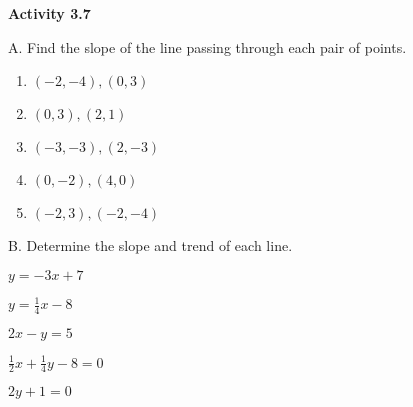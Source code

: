   \vspace*{-0.3ex}
\noindent\textbf{Activity 3.7}

\vspace{0.2ex}

\noindent A. Find the slope of the line passing through each pair of points.
\vspace{-1ex}
\begin{multicols}{3}
\begin{enumerate}[label = \arabic*. ]
   \item  $ (-2,-4), (0,3) $
   \item  $ (0,3), (2,1) $
   \item  $ (-3,-3), (2,-3) $
   \item  $ (0,-2), (4,0) $
   \item  $ (-2,3), (-2,-4) $
\end{enumerate}
\end{multicols}
				
\noindent B. Determine  the slope and trend  of each  line. 
\begin{enumerate}[label = \arabic*. ]
\begin{multicols}{3}

\item  $ y =-3x  + 7 $ 

\item  $ y =\displaystyle  \frac{1}{4}x-8 $ 

\item  $ 2x  -  y  = 5 $ 

\item  $ \displaystyle  \frac{1}{2}x+\displaystyle  \frac{1}{4}y-8 = 0 $ 

\item  $ 2y  + 1 = 0 $ 

\end{multicols} 
\end{enumerate}  				

 
				
